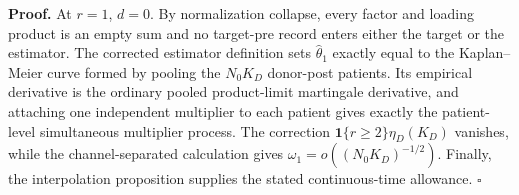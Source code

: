 \textbf{Proof.}
At \(r=1\), \(d=0\). By normalization collapse, every factor and loading product is an empty sum and no target-pre record enters either the target or the estimator. The corrected estimator definition sets \(\widehat\theta_1\) exactly equal to the Kaplan--Meier curve formed by pooling the \(N_0K_D\) donor-post patients. Its empirical derivative is the ordinary pooled product-limit martingale derivative, and attaching one independent multiplier to each patient gives exactly the patient-level simultaneous multiplier process. The correction \(\mathbf 1\{r\ge2\}\eta_D(K_D)\) vanishes, while the channel-separated calculation gives \(\omega_1=o((N_0K_D)^{-1/2})\). Finally, the interpolation proposition supplies the stated continuous-time allowance. \(\square\)